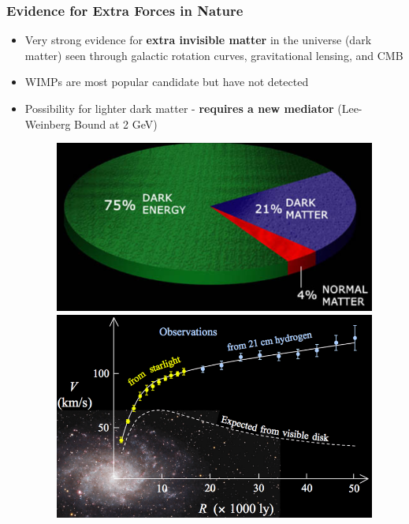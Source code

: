 \documentclass{beamer}
\begin{document}
\begin{frame}
\frametitle{Evidence for Extra Forces in Nature}
\begin{itemize}
\item Very strong evidence for \textbf{extra invisible matter} in the universe (dark matter) seen through galactic rotation curves, gravitational lensing, and CMB
\item WIMPs are most popular candidate but have not detected
\item Possibility for lighter dark matter - \textbf{requires a new mediator} (Lee-Weinberg Bound at 2 GeV)
\begin{figure}
\includegraphics[width=0.60\linewidth]{figs/darkmatter.png}
\includegraphics[width=0.50\linewidth]{figs/galaxy.png}
\end{figure}
\end{itemize}

\end{frame}

\end{document}
